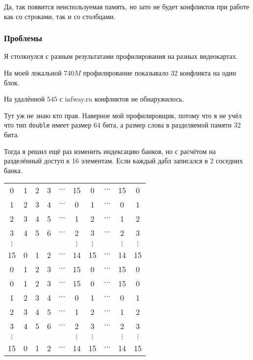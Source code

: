 \documentclass[12pt]{article}
\begin{document}
Да, так появится неиспользуемая память, но зато не будет конфликтов при работе как со строками, так и со столбцами.

\subsubsection*{Проблемы}

Я столкнулся с разным результатами профилирования на разных видеокартах.

На моей локальной $740M$ профилирование показывало 32 конфликта на один блок.

На удалённой $545$ с infway.ru конфликтов не обнаружилось.

Тут уж не знаю кто прав.
Наверное мой профилировщик, потому что я не учёл что тип \lstinline|double| имеет размер 64 бита,
а размер слова в разделяемой памяти 32 бита.

\smallbreak

Тогда я решил ещё раз изменить индексацию банков, но с расчётом на разделённый доступ к 16 элементам.
Если каждый дабл записался в 2 соседних банка.

\begin{tabular}[!htb]{cccccc|c|ccc}
	0        & 1 & 2 & 3 & $\cdots$ & 15       & 0        & $\cdots$ & 15       & 0        \\
	1        & 2 & 3 & 4 & $\cdots$ & 0        & 1        & $\cdots$ & 0        & 1        \\
	2        & 3 & 4 & 5 & $\cdots$ & 1        & 2        & $\cdots$ & 1        & 2        \\
	3        & 4 & 5 & 6 & $\cdots$ & 2        & 3        & $\cdots$ & 2        & 3        \\
	$\vdots$ &   &   &   &          & $\vdots$ & $\vdots$ &          & $\vdots$ & $\vdots$ \\
	15       & 0 & 1 & 2 & $\cdots$ & 14       & 15       & $\cdots$ & 14       & 15       \\
	\hline
	0        & 1 & 2 & 3 & $\cdots$ & 15       & 0        & $\cdots$ & 15       & 0        \\
	\hline
	0        & 1 & 2 & 3 & $\cdots$ & 15       & 0        & $\cdots$ & 15       & 0        \\
	1        & 2 & 3 & 4 & $\cdots$ & 0        & 1        & $\cdots$ & 0        & 1        \\
	2        & 3 & 4 & 5 & $\cdots$ & 1        & 2        & $\cdots$ & 1        & 2        \\
	3        & 4 & 5 & 6 & $\cdots$ & 2        & 3        & $\cdots$ & 2        & 3        \\
	$\vdots$ &   &   &   &          & $\vdots$ & $\vdots$ &          & $\vdots$ & $\vdots$ \\
	15       & 0 & 1 & 2 & $\cdots$ & 14       & 15       & $\cdots$ & 14       & 15       \\
\end{tabular}
\end{document}
